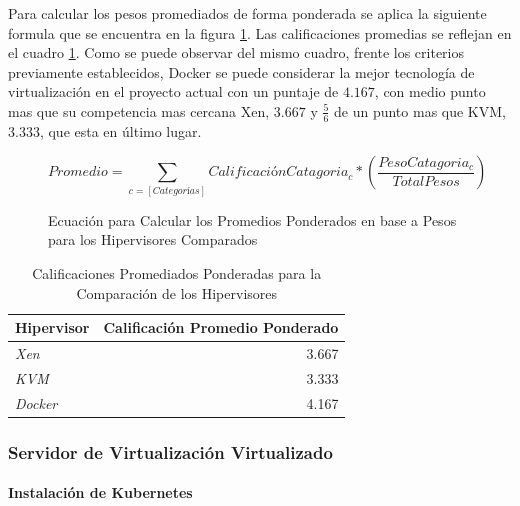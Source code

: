 Para calcular los pesos promediados de forma ponderada se aplica la siguiente formula que se encuentra en la figura \ref{fig:hipervisor-calif-equ}. Las calificaciones promedias se reflejan en el cuadro \ref{tab:hipervisor-compar-promed}. Como se puede observar del mismo cuadro, frente los criterios previamente establecidos, Docker se puede considerar la mejor tecnología de virtualización en el proyecto actual con un puntaje de $4.167$, con medio punto mas que su competencia mas cercana Xen, $3.667$ y $\frac{5}{6}$ de un punto mas que KVM, $3.333$, que esta en último lugar.

\begin{figure}
	\[
		Promedio = \sum_{c = [Categorías]} CalificaciónCatagoria_c * \left ( \frac{PesoCatagoria_c}{TotalPesos} \right )
	\]
	\caption{Ecuación para Calcular los Promedios Ponderados en base a Pesos para los Hipervisores Comparados}
    \label{fig:hipervisor-calif-equ}
\end{figure}

\begin{table}
	\centering
	\begin{tabular}{|l|r|}
    	\hline
		\textbf{Hipervisor} & \textbf{Calificación Promedio Ponderado} \\
        \hline
        \textit{Xen} & 3.667 \\
        \hline
        \textit{KVM} & 3.333 \\
        \hline
        \textit{Docker} & 4.167 \\
        \hline
	\end{tabular}
    \caption{Calificaciones Promediados Ponderadas para la Comparación de los Hipervisores}
    \label{tab:hipervisor-compar-promed}
\end{table}

  
\subsubsection{Servidor de Virtualización Virtualizado}
\paragraph{Instalación de Kubernetes}
